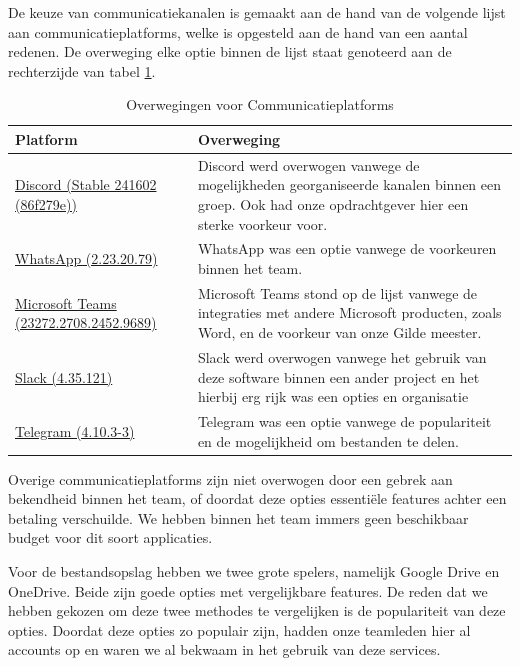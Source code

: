 \documentclass[a4paper]{report}
\begin{document}
De keuze van communicatiekanalen is gemaakt aan de hand van de volgende lijst aan communicatieplatforms, welke is opgesteld aan de hand van een aantal redenen.
De overweging elke optie binnen de lijst staat genoteerd aan de rechterzijde van tabel \ref{tab:comm_platforms}.
\begin{table}[H]
  \centering
  \begin{tabular}{|l|p{10cm}|}
    \hline
    \textbf{Platform} & \textbf{Overweging} \\
    \hline
    \href{https://discord.com/}{Discord (Stable 241602 (86f279e))} & Discord werd overwogen vanwege de mogelijkheden georganiseerde kanalen binnen een groep. Ook had onze opdrachtgever hier een sterke voorkeur voor. \\
    \hline
    \href{https://www.whatsapp.com/}{WhatsApp (2.23.20.79)} & WhatsApp was een optie vanwege de voorkeuren binnen het team. \\
    \hline
    \href{https://www.microsoft.com/en-us/microsoft-teams/group-chat-software}{Microsoft Teams (23272.2708.2452.9689)} & Microsoft Teams stond op de lijst vanwege de integraties met andere Microsoft producten, zoals Word, en de voorkeur van onze Gilde meester. \\
    \hline
    \href{https://slack.com/}{Slack (4.35.121)} & Slack werd overwogen vanwege het gebruik van deze software binnen een ander project en het hierbij erg rijk was een opties en organisatie \\
    \hline
    \href{https://telegram.org/}{Telegram (4.10.3-3)} & Telegram was een optie vanwege de populariteit en de mogelijkheid om bestanden te delen. \\
    \hline
  \end{tabular}
  \caption{Overwegingen voor Communicatieplatforms}
  \label{tab:comm_platforms}
\end{table}
Overige communicatieplatforms zijn niet overwogen door een gebrek aan bekendheid binnen het team, of doordat deze opties essentiële features achter een betaling verschuilde.
We hebben binnen het team immers geen beschikbaar budget voor dit soort applicaties.
\par\smallskip
Voor de bestandsopslag hebben we twee grote spelers, namelijk Google Drive en OneDrive. 
Beide zijn goede opties met vergelijkbare features. De reden dat we hebben gekozen om deze twee methodes te vergelijken is de populariteit van deze opties.
Doordat deze opties zo populair zijn, hadden onze teamleden hier al accounts op en waren we al bekwaam in het gebruik van deze services.
\end{document}
